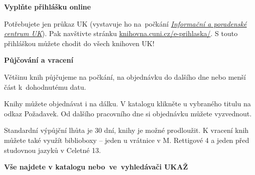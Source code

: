 

\ifdefined\ikonka\else%
\newcommand\ikonka[1]{\bigskip\bgroup\Large #1\egroup\par}
\renewcommand\section[2][]{%
  \bgroup\large \textbf{#2}\egroup\par%
}
\fi
\ikonka{\faPencil}
\section{Vyplňte přihlášku online}

Potřebujete jen průkaz UK (vystavuje ho na~počkání \href{http://www.cuni.cz/UK-3249.html}{\emph{Informační a poradenské
  centrum UK}}). Pak navštivte stránku \url{knihovna.cuni.cz/e-prihlaska/}.
S touto přihláškou můžete chodit do všech knihoven UK! 

\ikonka{\faBook}
\section{Půjčování a vracení}

Většinu knih
půjčujeme na počkání, %
na objednávku do dalšího dne nebo menší část k~dohodnutému datu.


Knihy můžete objednávat i na dálku.
V katalogu klikněte u vybraného titulu na odkaz Požadavek. Od dalšího pracovního
dne si objednávku můžete vyzvednout.  

Standardní výpůjční lhůta je 30 dní, knihy je možné prodloužit. K vracení knih
můžete také využít biblioboxy – jeden u vrátnice v M. Rettigové 4 a jeden před
studovnou jazyků v Celetné 13.   


\ikonka{\faSearch}
\section{Vše najdete v katalogu nebo~ve~vyhledávači UKAŽ}

